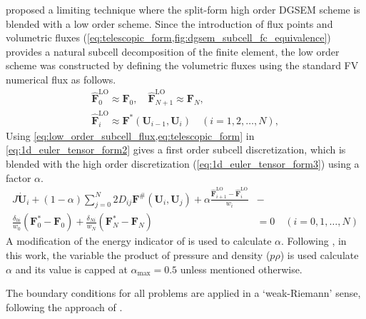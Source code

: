 \documentclass[a4paper,11pt,oneside]{article}
\newcommand{\citear}[1]{\citeauthor{#1} \cite{#1}} %
\newcommand{\vect}[1]{\ensuremath{\boldsymbol{\mathbf{#1}}}} %
\newcommand{\textlo}{\text{LO}} %
\newcommand{\textmax}{\text{max}} %
\newcommand{\eulerref}[1]{\ensuremath{#1}} %
\begin{document}
\citear{hennemannRamirezHindenlang2021} proposed a limiting technique where the split-form high order DGSEM scheme is blended with a low order scheme. Since the introduction of flux points and volumetric fluxes (\cref{eq:telescopic_form,fig:dgsem_subcell_fc_equivalence}) provides a natural subcell decomposition of the finite element, the low order scheme was constructed by defining the volumetric fluxes using the standard FV numerical flux as follows.
\begin{equation}
	\begin{gathered}
		\hat{\vect{\eulerref{F}}}^\textlo_0 \approx \vect{\eulerref{F}}_0, \quad \hat{\vect{\eulerref{F}}}^\textlo_{N+1} \approx \vect{\eulerref{F}}_N,\\
		\hat{\vect{\eulerref{F}}}^\textlo_i \approx \vect{\eulerref{F}}^*(\vect{\eulerref{U}}_{i-1}, \vect{\eulerref{U}}_i)\quad (i=1,2,\ldots,N),
	\end{gathered}
	\label{eq:low_order_subcell_flux}
\end{equation}
Using \cref{eq:low_order_subcell_flux,eq:telescopic_form} in \cref{eq:1d_euler_tensor_form2} gives a first order subcell discretization, which is blended with the high order discretization (\cref{eq:1d_euler_tensor_form3}) using a factor $\alpha$.
\begin{equation}
	\begin{aligned}
		J \dot{\vect{\eulerref{U}}}_i + (1-\alpha) \sum_{j=0}^{N} 2 D_{ij} \vect{\eulerref{F}}^\#(\vect{\eulerref{U}}_i, \vect{\eulerref{U}}_j) + \alpha \frac{\hat{\vect{\eulerref{F}}}^\textlo_{i+1} - \hat{\vect{\eulerref{F}}}^\textlo_i}{w_i} &-\\
		\frac{\delta_{0i}}{w_0} \left( \vect{\eulerref{F}}^*_0 - \vect{\eulerref{F}}_0 \right) + \frac{\delta_{Ni}}{w_N} \left( \vect{\eulerref{F}}^*_N - \vect{\eulerref{F}}_N \right) &= 0 \quad (i=0,1,\ldots,N)
	\end{aligned}
	\label{eq:1d_euler_tensor_form4}
\end{equation}
A modification of the energy indicator of \citear{perssonPeraire2006} is used to calculate $\alpha$. Following \cite{hennemannRamirezHindenlang2021}, in this work, the variable the product of pressure and density ($p\rho$) is used calculate $\alpha$ and its value is capped at $\alpha_\textmax=0.5$ unless mentioned otherwise.

The boundary conditions for all problems are applied in a `weak-Riemann' sense, following the approach of \citear{mengaldoDeGraziaPeiro2014}.
\end{document}
